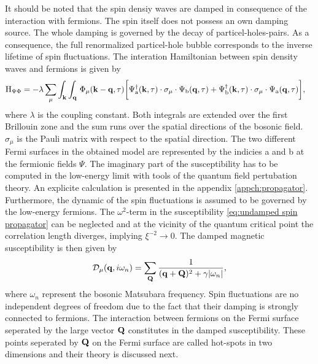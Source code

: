 It should be noted that the spin densiy waves are damped in consequence of the interaction with fermions.
The spin itself does not possess an own damping source.
The whole damping is governed by the decay of particel-holes-pairs.
As a consequence, the full renormalized particel-hole bubble corresponds to the inverse lifetime of spin fluctuations.
The interation Hamiltonian between spin density waves and fermions is given by
%
\begin{align}
	\mathrm{H}_{\Psi\Phi} &= 
		-\lambda \sum\limits_{\mu} \int_{\vb{k}} \int_{\vb{q}}\,
		\Phi_{\mu}(\vb{k}-\vb{q}, \tau)
		\bigg[
			\Psi_{\mathrm{a}}^{\dag}(\vb{k},\tau) \cdot \sigma_{\mu} \cdot \Psi_{\mathrm{b}}(\vb{q},\tau)
			+
			\Psi_{\mathrm{b}}^{\dag}(\vb{k},\tau) \cdot \sigma_{\mu} \cdot \Psi_{\mathrm{a}}(\vb{q},\tau)
		\bigg],
	\label{eq:Hamiltonian interaction}
\end{align}
%
where $\lambda$ is the coupling constant. 
Both integrals are extended over the first Brillouin zone and the sum runs over the spatial directions of the bosonic field.
$\sigma_{\mu}$ is the Pauli matrix with respect to the spatial direction.
The two different Fermi surfaces in the obtained model are represented by the indicies a and b at the fermionic fields $\Psi$.
The imaginary part of the susceptibility has to be computed in the low-energy limit with tools of the quantum field pertubation theory.
An explicite calculation is presented in the appendix \ref{appch:propagator}.
Furthermore, the dynamic of the spin fluctuations is assumed to be governed by the low-energy fermions.
The $\omega^{2}$-term in the susceptibility \eqref{eq:undamped spin propagator} can be neglected \cite{Abanov&Chubukov&Schmalian} and at the vicinity of the quantum critical point the correlation length diverges, implying $\xi^{-2} \to 0$.
The damped magnetic susceptibility is then given by
%
\begin{align}
	\mathcal{D}_{\mu}(\vb{q}, i\omega_{n}) = \sum\limits_{\vb{Q}} \frac{1}{(\vb{q}+\vb{Q})^{2} + \gamma|\omega_{n}|},
	\label{eq:damped spin propagator}
\end{align}
%
where $\omega_{n}$ represent the bosonic Matsubara frequency.
Spin fluctuations are no independent degrees of freedom due to the fact that their damping is strongly connected to fermions.
The interaction between fermions on the Fermi surface seperated by the large vector $\vb{Q}$ constitutes in the damped susceptibility.
These points seperated by $\vb{Q}$ on the Fermi surface are called hot-spots in two dimensions and their theory is discussed next.
